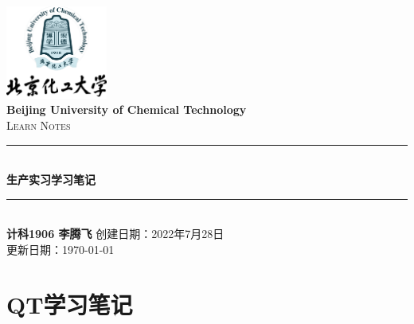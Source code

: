 \documentclass[cs4size,a4paper]{ctexart}
\numberwithin{equation}{section}
\numberwithin{table}{section}
\numberwithin{figure}{section}
\newcommand{\HRule}{\rule{\linewidth}{0.5mm}}
\begin{document}
\newtheorem{example}{例}              	%
\newtheorem{algorithem}{算法}	
\newtheorem{theorem}{定理}            	%
\newtheorem{definition}{定义}
\newtheorem{axiom}{公理}
\newtheorem{property}{性质}
\newtheorem{proposition}{命题}
\newtheorem{lemma}{引理}
\newtheorem{corollary}{推论}
\newtheorem{remark}{注解}
\newtheorem{condition}{条件}
\newtheorem{conclusion}{结论}
\newtheorem{assumption}{假设}
\renewcommand{\contentsname}{目录}     
\renewcommand{\abstractname}{摘要} 
\renewcommand{\refname}{参考文献}     
\renewcommand{\indexname}{索引}
\renewcommand{\figurename}{图}
\renewcommand{\tablename}{表}
\renewcommand{\appendixname}{附录}
\renewcommand{\proofname}{证明}
\renewcommand\emph[1]{\textcolor{red}{\textbf{#1}}}
\begin{titlepage}
\begin{center}
\includegraphics[width=0.25\textwidth]{logo}\\[1cm]    
\textsf{\Large\bfseries Beijing University of Chemical Technology}\\[1.0cm]
\textsc{\Large Learn Notes}\\[0.5cm]
\HRule \\[0.8cm]
{\huge \bfseries 生产实习学习笔记}\\[0.4cm]
\HRule \\[0.7cm]
\textsf{\bfseries 计科1906 李腾飞}
\tableofcontents 
\vfill
{创建日期：2022年7月28日}\\
{更新日期：\today}
\end{center}
\end{titlepage}
\pagestyle{plain}
\thispagestyle{empty}
\pagestyle{fancy}



\section{QT学习笔记}
\end{document}
